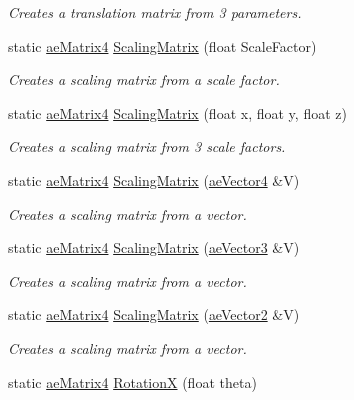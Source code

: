 \begin{DoxyCompactItemize}
\begin{DoxyCompactList}\small\item\em Creates a translation matrix from 3 parameters. \end{DoxyCompactList}\item 
static \hyperlink{structae_core_1_1ae_matrix4}{ae\+Matrix4} \hyperlink{structae_core_1_1ae_matrix4_a3e1e3588a5ef46ff48b5bb19a035db62}{Scaling\+Matrix} (float Scale\+Factor)
\begin{DoxyCompactList}\small\item\em Creates a scaling matrix from a scale factor. \end{DoxyCompactList}\item 
static \hyperlink{structae_core_1_1ae_matrix4}{ae\+Matrix4} \hyperlink{structae_core_1_1ae_matrix4_a41f1bdd6746dbe46da866291de66f89d}{Scaling\+Matrix} (float x, float y, float z)
\begin{DoxyCompactList}\small\item\em Creates a scaling matrix from 3 scale factors. \end{DoxyCompactList}\item 
static \hyperlink{structae_core_1_1ae_matrix4}{ae\+Matrix4} \hyperlink{structae_core_1_1ae_matrix4_aab8f5934f3de1e3046d627f5127abeda}{Scaling\+Matrix} (\hyperlink{structae_core_1_1ae_vector4}{ae\+Vector4} \&V)
\begin{DoxyCompactList}\small\item\em Creates a scaling matrix from a vector. \end{DoxyCompactList}\item 
static \hyperlink{structae_core_1_1ae_matrix4}{ae\+Matrix4} \hyperlink{structae_core_1_1ae_matrix4_ab087e82eb1283cd705fa447f0bf21727}{Scaling\+Matrix} (\hyperlink{structae_core_1_1ae_vector3}{ae\+Vector3} \&V)
\begin{DoxyCompactList}\small\item\em Creates a scaling matrix from a vector. \end{DoxyCompactList}\item 
static \hyperlink{structae_core_1_1ae_matrix4}{ae\+Matrix4} \hyperlink{structae_core_1_1ae_matrix4_a2c2e05aa062c77d9545f948fe3696444}{Scaling\+Matrix} (\hyperlink{structae_core_1_1ae_vector2}{ae\+Vector2} \&V)
\begin{DoxyCompactList}\small\item\em Creates a scaling matrix from a vector. \end{DoxyCompactList}\item 
static \hyperlink{structae_core_1_1ae_matrix4}{ae\+Matrix4} \hyperlink{structae_core_1_1ae_matrix4_a66003c6d9737960a245e676e1e8c1059}{RotationX} (float theta)

\end{DoxyCompactItemize}

